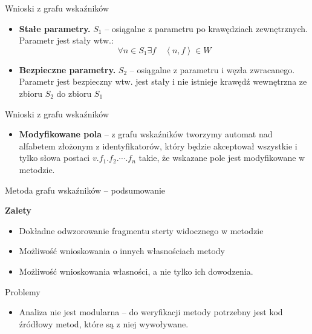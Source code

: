 \documentclass{beamer}
\begin{document}
\begin{frame}{Wnioski z grafu wskaźników}
  \begin{itemize}
    \item \textbf{Stałe parametry.}  $S_1$ -- osiągalne z parametru po
      krawędziach zewnętrznych. Parametr jest stały wtw.:
      $$\forall n \in S_1 \exists f \quad \left<n,f\right>\in W$$
    \item \textbf{Bezpieczne parametry.} $S_2$ -- osiągalne z
      parametru i węzła zwracanego. Parametr jest bezpieczny wtw. jest
      stały i nie istnieje krawędź wewnętrzna ze zbioru $S_2$ do
      zbioru $S_1$
  \end{itemize}
\end{frame}

\begin{frame}{Wnioski z grafu wskaźników}
  \begin{itemize}
    \item \textbf{Modyfikowane pola} -- z grafu wskaźników tworzymy
      automat nad alfabetem złożonym z identyfikatorów, który będzie
      akceptował wszystkie i tylko słowa postaci $v.f_1.f_2.\cdots.f_n$
      takie, że wskazane pole jest modyfikowane w metodzie. 
  \end{itemize}
\end{frame}

\begin{frame}{Metoda grafu wskaźników -- podsumowanie}
  \begin{beamerboxesrounded}[upper=gr, lower=lgr, shadow=true]{\bf Zalety}
    \begin{itemize}
    \item Dokładne odwzorowanie fragmentu sterty widocznego w metodzie
    \item Możliwość wnioskowania o innych własnościach metody
    \item Możliwość wnioskowania własności, a nie tylko ich dowodzenia. 
    \end{itemize}
  \end{beamerboxesrounded}
  \pause
  \begin{alertblock}{Problemy}
    \begin{itemize}
    \item Analiza nie jest modularna -- do weryfikacji metody
      potrzebny jest kod źródłowy metod, które są z niej wywoływane.
    \end{itemize}
  \end{alertblock}
\end{frame}
\end{document}
